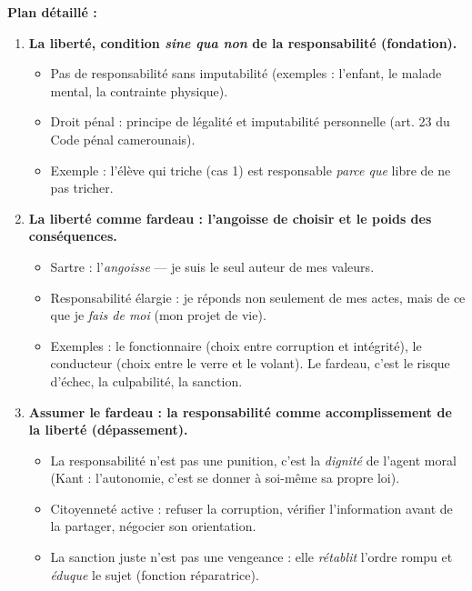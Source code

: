 \documentclass[11pt]{article}
\begin{document}
\begin{exoresolu}
\textbf{Plan détaillé :}
\begin{enumerate}
    \item \textbf{La liberté, condition \emph{sine qua non} de la responsabilité (fondation).}
    \begin{itemize}
        \item Pas de responsabilité sans imputabilité (exemples : l'enfant, le malade mental, la contrainte physique).
        \item Droit pénal : principe de légalité et imputabilité personnelle (art. 23 du Code pénal camerounais).
        \item Exemple : l'élève qui triche (cas 1) est responsable \emph{parce que} libre de ne pas tricher.
    \end{itemize}
    \item \textbf{La liberté comme fardeau : l'angoisse de choisir et le poids des conséquences.}
    \begin{itemize}
        \item Sartre : l'\emph{angoisse} — je suis le seul auteur de mes valeurs.
        \item Responsabilité élargie : je réponds non seulement de mes actes, mais de ce que je \emph{fais de moi} (mon projet de vie).
        \item Exemples : le fonctionnaire (choix entre corruption et intégrité), le conducteur (choix entre le verre et le volant). Le fardeau, c'est le risque d'échec, la culpabilité, la sanction.
    \end{itemize}
    \item \textbf{Assumer le fardeau : la responsabilité comme accomplissement de la liberté (dépassement).}
    \begin{itemize}
        \item La responsabilité n'est pas une punition, c'est la \emph{dignité} de l'agent moral (Kant : l'autonomie, c'est se donner à soi-même sa propre loi).
        \item Citoyenneté active : refuser la corruption, vérifier l'information avant de la partager, négocier son orientation.
        \item La sanction juste n'est pas une vengeance : elle \emph{rétablit} l'ordre rompu et \emph{éduque} le sujet (fonction réparatrice).
    \end{itemize}
\end{enumerate}


\end{exoresolu}
\end{document}

